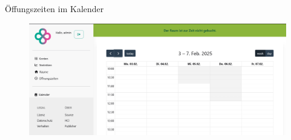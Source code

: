 \begin{frame}{Öffungszeiten im Kalender}
    \thispagestyle{plain}
    \begin{figure}
        \centering
        \includegraphics[width=1\linewidth]{pictures/calendar_opening_hours.png}
        \label{fig:enter-label}
    \end{figure}
\end{frame}